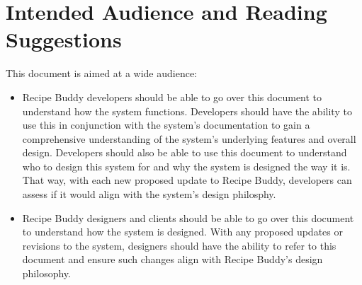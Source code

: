 \documentclass{scrreprt}
\begin{document}
\section{Intended Audience and Reading Suggestions}
$ $This document is aimed at a wide audience:
\begin{itemize}
    \item \gls{Recipe Buddy} developers should be able to go over this document to understand how the system functions.
          Developers should have the ability to use this in conjunction with the system's \gls{documentation} to gain a comprehensive understanding of the system's underlying features and overall design.
          Developers should also be able to use this document to understand who to design this system for and why the system is designed the way it is.
          That way, with each new proposed update to \gls{Recipe Buddy}, developers can assess if it would align with the system's design philosphy.
    \item \gls{Recipe Buddy} designers and clients should be able to go over this document to understand how the system is designed.
          With any proposed updates or revisions to the system, designers should have the ability to refer to this document and ensure such changes align with \gls{Recipe Buddy}'s design philosophy.
\end{itemize}
$ $
\end{document}
